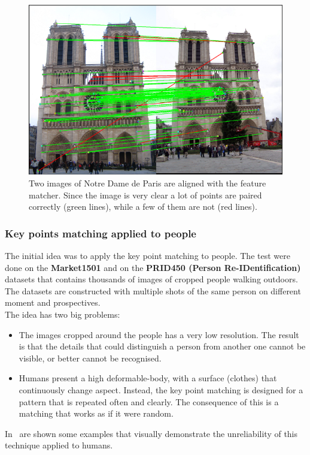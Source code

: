\begin{figure}[!h]
\centering
\includegraphics[width=0.7\linewidth]{images/recognition/kpMatch_notreDame}
\caption{Two images of Notre Dame de Paris are aligned with the feature matcher. Since the image is very clear a lot of points are paired correctly (green lines), while a few of them are not (red lines).}
\label{fig:kpMatch_notreDame}
\end{figure}

\subsubsection*{Key points matching applied to people}
The initial idea was to apply the key point matching to people. The test were done on the \textbf{Market1501}\cite{market1501} and on the \textbf{PRID450 (Person Re-IDentification)}\cite{prid450} datasets that contains thousands of images of cropped people walking outdoors. The datasets are constructed with multiple shots of the same person on different moment and prospectives.\\
The idea has two big problems:
\begin{itemize}
	\item The images cropped around the people has a very low resolution. The result is that the details that could distinguish a person from another one cannot be visible, or better cannot be recognised.
	\item Humans present a high deformable-body, with a surface (clothes) that continuously change aspect. Instead, the key point matching is designed for a pattern that is repeated often and clearly. The consequence of this is a matching that works as if it were random.
\end{itemize}
In~ are shown some examples that visually demonstrate the unreliability of this technique applied to humans.

